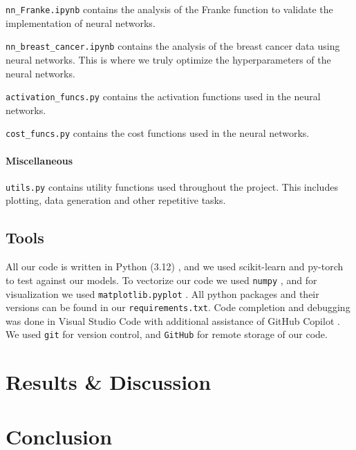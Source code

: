 \documentclass[aps,pra,english,notitlepage,reprint,nofootinbib]{revtex4-1}  %
\begin{document}
\verb|nn_Franke.ipynb| contains the analysis of the Franke function to validate the implementation of neural networks.

\verb|nn_breast_cancer.ipynb| contains the analysis of the breast cancer data using neural networks. This is where we truly optimize the hyperparameters of the neural networks.

\verb|activation_funcs.py| contains the activation functions used in the neural networks.

\verb|cost_funcs.py| contains the cost functions used in the neural networks.

\paragraph*{Miscellaneous}
\verb|utils.py| contains utility functions used throughout the project. This includes plotting, data generation and other repetitive tasks.

\subsection{Tools}\label{subsec:tools}

All our code is written in Python (3.12) \cite{Python}, and we used scikit-learn \cite{scikit-learn} and py-torch to test against our models. To vectorize our code we used \verb|numpy| \cite{Numpy}, and for visualization we used \verb|matplotlib.pyplot| \cite{Matplotlib}. All python packages and their versions can be found in our \verb|requirements.txt|. Code completion and debugging was done in Visual Studio Code \cite{VSCode} with additional assistance of GitHub Copilot \cite{Copilot}. We used \verb|git| \cite{Git} for version control, and \verb|GitHub| \cite{GitHub} for remote storage of our code.

\section{Results \& Discussion}\label{sec:results discussion}



\section{Conclusion}\label{sec:conclusion}

\end{document}
